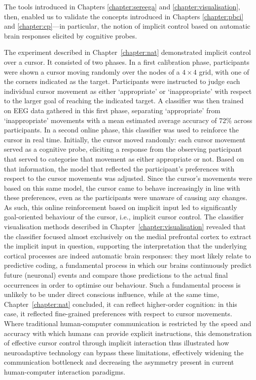 The tools introduced in Chapters \ref{chapter:sereega} and \ref{chapter:visualisation}, then, enabled us to validate the concepts introduced in Chapters \ref{chapter:pbci} and \ref{chapter:cp}---in particular, the notion of implicit control based on automatic brain responses elicited by cognitive probes.

The experiment described in Chapter~\ref{chapter:nat} demonstrated implicit control over a cursor. It consisted of two phases. In a first calibration phase, participants were shown a cursor moving randomly over the nodes of a $4\times4$ grid, with one of the corners indicated as the target. Participants were instructed to judge each individual cursor movement as either `appropriate' or `inappropriate' with respect to the larger goal of reaching the indicated target. A classifier was then trained on EEG data gathered in this first phase, separating `appropriate' from `inappropriate' movements with a mean estimated average accuracy of 72\% across participants. In a second online phase, this classifier was used to reinforce the cursor in real time. Initially, the cursor moved randomly: each cursor movement served as a cognitive probe, eliciting a response from the observing participant that served to categorise that movement as either appropriate or not. Based on that information, the model that reflected the participant's preferences with respect to the cursor movements was adjusted. Since the cursor's movements were based on this same model, the cursor came to behave increasingly in line with these preferences, even as the participants were unaware of causing any changes. As such, this online reinforcement based on implicit input led to significantly goal-oriented behaviour of the cursor, i.e., implicit cursor control. The classifier visualisation methods described in Chapter~\ref{chapter:visualisation} revealed that the classifier focused almost exclusively on the medial prefrontal cortex to extract the implicit input in question, supporting the interpretation that the underlying cortical processes are indeed automatic brain responses: they most likely relate to predictive coding, a fundamental process in which our brains continuously predict future (neuronal) events and compare those predictions to the actual final occurrences in order to optimise our behaviour. Such a fundamental process is unlikely to be under direct conscious influence, while at the same time, Chapter~\ref{chapter:nat} concluded, it can reflect higher-order cognition: in this case, it reflected fine-grained preferences with respect to cursor movements. Where traditional human-computer communication is restricted by the speed and accuracy with which humans can provide explicit instructions, this demonstration of effective cursor control through implicit interaction thus illustrated how neuroadaptive technology can bypass these limitations, effectively widening the communication bottleneck and decreasing the asymmetry present in current human-computer interaction paradigms.

